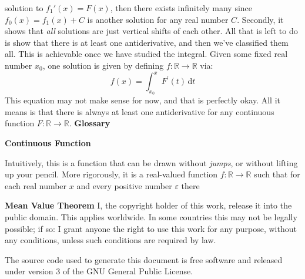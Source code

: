 \documentclass{article}
\begin{document}
    solution to $f_{1}'(x)=F(x)$, then there exists infinitely many since
    $f_{0}(x)=f_{1}(x)+C$ is another solution for any real number $C$.
    Secondly, it shows that \textit{all} solutions are just vertical shifts of
    each other. All that is left to do is show that there is at least one
    antiderivative, and then we've classified them all. This is achievable once
    we have studied the integral. Given some fixed real number $x_{0}$,
    one solution is given by defining $f:\mathbb{R}\rightarrow\mathbb{R}$
    via:
    \begin{equation}
        f(x)=\int_{x_{0}}^{x}F^{\prime}(t)\,\textrm{d}t
    \end{equation}
    This equation may not make sense for now, and that is perfectly okay.
    All it means is that there is always at least one antiderivative for any
    continuous function $F:\mathbb{R}\rightarrow\mathbb{R}$.
\ifx\noPreamble\undefined
    \newpage
    \Large{\textbf{Glossary}}
    \par\hfill\par
    \textbf{Continuous Function}
    \par
    Intuitively, this is a function that can be drawn without \textit{jumps},
    or without lifting up your pencil. More rigorously, it is a real-valued
    function $f:\mathbb{R}\rightarrow\mathbb{R}$ such that for each real number
    $x$ and every positive number $\varepsilon$ there
    \par\hfill\par
    \textbf{Mean Value Theorem}
    \newpage
    I, the copyright holder of this work, release it into the public domain.
    This applies worldwide. In some countries this may not be legally possible;
    if so: I grant anyone the right to use this work for any purpose, without
    any conditions, unless such conditions are required by law.
    \par\hfill\par
    The source code used to generate this document is free software and released
    under version 3 of the GNU General Public License.
\end{document}
